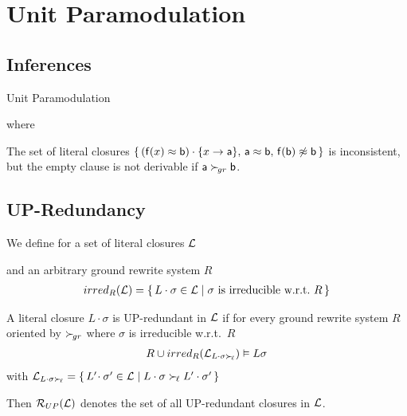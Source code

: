\documentclass[%
handout,
]{beamer}
\begin{document}
\section{Unit Paramodulation}
\subsection{Inferences}
\begin{frame}{Unit Paramodulation}

    
    where
    

    \vspace{1.4em}
    \begin{remark}
    The set of literal closures
    $\{\,
    (\mathsf{f}(x)\approx\mathsf{b})\cdot\{x\to\mathsf{a}\},\,
    \mathsf{a}\approx \mathsf{b},\,
    \mathsf{f}(\mathsf{b})\not\approx\mathsf{b}\,
    \}$ is inconsistent,
    but the empty clause is not derivable
    if $\mathsf{a}\mathrel\succ_{\!gr}\mathsf{b}$.
    \end{remark}

\end{frame}


\subsection{UP-Redundancy}
\begin{frame}[allowframebreaks]

        We define for a set of literal closures $\mathcal{L}$

        and an
        arbitrary ground rewrite system $R$
        \begin{gather*}
            irred_R(\mathcal{L}) =
            \{\,
                L\cdot\sigma\in\mathcal{L} \mid
                \sigma\text{ is irreducible w.r.t.~}R
            \,\}
        \end{gather*}

    A literal closure $L\cdot\sigma$ is UP-redundant in $\mathcal{L}$ if
    for every ground rewrite system $R$
    oriented by $\mathrel\succ_{\!gr}$
    where $\sigma$ is irreducible w.r.t.~$R$
    \begin{gather*}
    R \cup irred_R(\mathcal{L}_{L\cdot\sigma\mathrel\succ_{\!\ell}}) \vDash L\sigma
    \end{gather*}
    with
    $
        \mathcal{L}_{L\cdot\sigma\mathrel\succ_{\!\ell}} =
        \{\,
            L'\!\cdot\sigma'\in\mathcal{L} \mid
            L\cdot\sigma\mathrel\succ_{\!\ell} L'\cdot\sigma'
        \,\}
    $

    \vspace{1.4em}
    Then $\mathcal{R}_{UP}(\mathcal{L})$ denotes the set of all UP-redundant closures in $\mathcal{L}$.

\end{frame}
\end{document}
